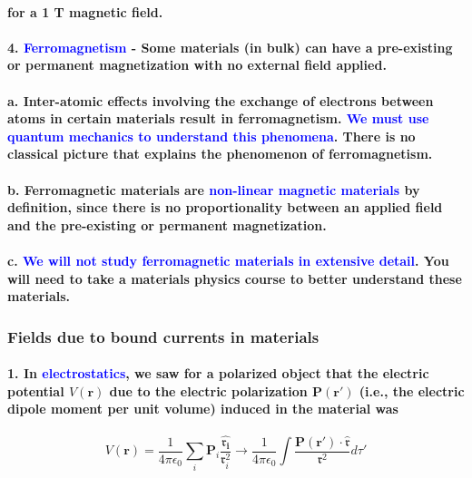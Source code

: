 \documentclass{article}
\begin{document}
\paragraph{for a 1 T magnetic field.}
\paragraph{4. \textcolor{blue}{Ferromagnetism} - Some materials (in bulk) can have a pre-existing or permanent magnetization with no external field applied.}
\paragraph{\indent a. Inter-atomic effects involving the exchange of electrons between atoms in certain materials result in ferromagnetism. \textcolor{blue}{We must use quantum mechanics to understand this phenomena}. There is no classical picture that explains the phenomenon of ferromagnetism.}
\paragraph{\indent b. Ferromagnetic materials are \textcolor{blue}{non-linear magnetic materials} by definition, since there is no proportionality between an applied field and the pre-existing or permanent magnetization.}
\paragraph{\indent c. \textcolor{blue}{We will not study ferromagnetic materials in extensive detail}. You will need to take a materials physics course to better understand these materials.}
\subsubsection{Fields due to bound currents in materials}
\paragraph{1. In \textcolor{blue}{electrostatics}, we saw for a polarized object that the electric potential $V(\boldsymbol{r})$ due to the electric polarization $\boldsymbol{P}(\boldsymbol{r}')$ (i.e., the electric dipole moment per unit volume) induced in the material was}
\begin{equation*}
    V(\boldsymbol{r})=\frac{1}{4\pi\epsilon_0}\sum_{i}\boldsymbol{P}_i \frac{\hat{\boldsymbol{\mathfrak{r}_i}}}{\mathfrak{r}_i^2}\rightarrow \frac{1}{4\pi\epsilon_0}\int\frac{\boldsymbol{P}(\boldsymbol{r}')\cdot\hat{\boldsymbol{\mathfrak{r}}}}{\mathfrak{r}^2}d\tau'
\end{equation*}
\end{document}
